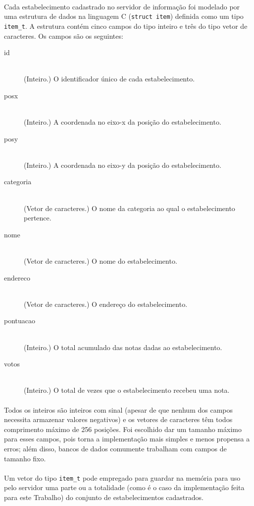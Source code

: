 \documentclass[a4paper,10pt,oneside,final,titlepage,onecolumn]{scrartcl}
\begin{document}
\paragraph{}Cada estabelecimento cadastrado no servidor de informação foi modelado por uma estrutura de dados na linguagem C (\verb|struct item|) definida como um tipo \verb|item_t|. A estrutura contém cinco campos do tipo inteiro e três do tipo vetor de caracteres. Os campos são os seguintes:
\begin{description}
 \item[id] \hfill \\ (Inteiro.) O identificador único de cada estabelecimento.
 \item[posx] \hfill \\ (Inteiro.) A coordenada no eixo-x da posição do estabelecimento.
 \item[posy] \hfill \\ (Inteiro.) A coordenada no eixo-y da posição do estabelecimento.
 \item[categoria] \hfill \\ (Vetor de caracteres.) O nome da categoria ao qual o estabelecimento pertence.
 \item[nome] \hfill \\ (Vetor de caracteres.) O nome do estabelecimento.
 \item[endereco] \hfill \\ (Vetor de caracteres.) O endereço do estabelecimento.
 \item[pontuacao] \hfill \\ (Inteiro.) O total acumulado das notas dadas ao estabelecimento.
 \item[votos] \hfill \\ (Inteiro.) O total de vezes que o estabelecimento recebeu uma nota.
\end{description}
\paragraph{}Todos os inteiros são inteiros com sinal (apesar de que nenhum dos campos necessita armazenar valores negativos) e os vetores de caracteres têm todos comprimento máximo de 256 posições. Foi escolhido dar um tamanho máximo para esses campos, pois torna a implementação mais simples e menos propensa a erros; além disso, bancos de dados comumente trabalham com campos de tamanho fixo.
\paragraph{}Um vetor do tipo \verb|item_t| pode empregado para guardar na memória para uso pelo servidor uma parte ou a totalidade (como é o caso da implementação feita para este Trabalho) do conjunto de estabelecimentos cadastrados.
\end{document}

